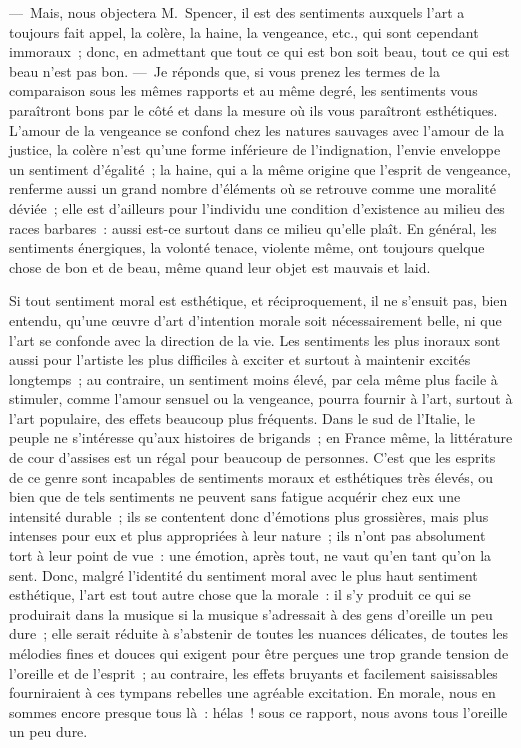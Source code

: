 \documentclass[french,twoside]{book} %
\begin{document}
— Mais, nous objectera M. Spencer, il est des sentiments auxquels l’art a toujours fait appel, la colère, la haine, la vengeance, etc., qui sont cependant immoraux ; donc, en admettant que tout ce qui est bon soit beau, tout ce qui est beau n’est pas bon. — Je réponds que, si vous prenez les termes de la comparaison sous les mêmes rapports et au même degré, les sentiments vous paraîtront bons par le côté et dans la mesure où ils vous paraîtront esthétiques. L’amour  de la vengeance se confond chez les natures sauvages avec l’amour de la justice, la colère n’est qu’une forme inférieure de l’indignation, l’envie enveloppe un sentiment d’égalité ; la haine, qui a la même origine que l’esprit de vengeance, renferme aussi un grand nombre d’éléments où se retrouve comme une moralité déviée ; elle est d’ailleurs pour l’individu une condition d’existence au milieu des races barbares : aussi est-ce surtout dans ce milieu qu’elle plaît. En général, les sentiments énergiques, la volonté tenace, violente même, ont toujours quelque chose de bon et de beau, même quand leur objet est mauvais et laid.\par
Si tout sentiment moral est esthétique, et réciproquement, il ne s’ensuit pas, bien entendu, qu’une œuvre d’art d’intention morale soit nécessairement belle, ni que l’art se confonde avec la direction de la vie. Les sentiments les plus inoraux sont aussi pour l’artiste les plus difficiles à exciter et surtout à maintenir excités longtemps ; au contraire, un sentiment moins élevé, par cela même plus facile à stimuler, comme l’amour sensuel ou la vengeance, pourra fournir à l’art, surtout à l’art populaire, des effets beaucoup plus fréquents. Dans le sud de l’Italie, le peuple ne s’intéresse qu’aux histoires de brigands ; en France même, la littérature de cour d’assises est un régal pour beaucoup de personnes. C’est que les esprits de ce genre sont incapables de sentiments moraux et esthétiques très élevés, ou bien que de tels sentiments ne peuvent sans fatigue acquérir chez eux une intensité durable ; ils se contentent donc d’émotions plus grossières, mais plus intenses pour eux et plus appropriées à leur nature ; ils n’ont pas absolument tort à  leur point de vue : une émotion, après tout, ne vaut qu’en tant qu’on la sent. Donc, malgré l’identité du sentiment moral avec le plus haut sentiment esthétique, l’art est tout autre chose que la morale : il s’y produit ce qui se produirait dans la musique si la musique s’adressait à des gens d’oreille un peu dure ; elle serait réduite à s’abstenir de toutes les nuances délicates, de toutes les mélodies fines et douces qui exigent pour être perçues une trop grande tension de l’oreille et de l’esprit ; au contraire, les effets bruyants et facilement saisissables fourniraient à ces tympans rebelles une agréable excitation. En morale, nous en sommes encore presque tous là : hélas ! sous ce rapport, nous avons tous l’oreille un peu dure.\par
\end{document}

